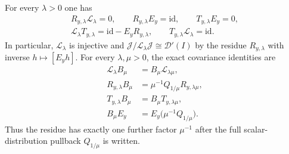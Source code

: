 \begin{theorem}
\label{thm:SDB-frobenius}
For every $\lambda>0$ one has
\begin{equation}\tag{SDB49}\label{eq:SDB-lambdaidentities}
 \begin{gathered}
 R_{y,\lambda}\mathcal L_\lambda=0,\qquad
 R_{y,\lambda}E_y=\mathrm{id},\qquad
 T_{y,\lambda}E_y=0,\\
 \mathcal L_\lambda T_{y,\lambda}
       =\mathrm{id}-E_yR_{y,\lambda},\qquad
 T_{y,\lambda}\mathcal L_\lambda=\mathrm{id}.
 \end{gathered}
\end{equation}
In particular, $\mathcal L_\lambda$ is injective and
$\mathcal J/\mathcal L_\lambda\mathcal J\cong\mathcal D'(I)$
by the residue $R_{y,\lambda}$ with inverse $h\mapsto[E_yh]$.
For every $\lambda,\mu>0$, the exact covariance identities are
\begin{equation}\tag{SDB50}\label{eq:SDB-Frobeniuscovariance}
 \begin{aligned}
 \mathcal L_\lambda B_\mu&=B_\mu\mathcal L_{\lambda\mu},\\
 R_{y,\lambda}B_\mu
       &=\mu^{-1}Q_{1/\mu}R_{y,\lambda\mu},\\
 T_{y,\lambda}B_\mu&=B_\mu T_{y,\lambda\mu},\\
 B_\mu E_y&=E_y\bigl(\mu^{-1}Q_{1/\mu}\bigr).
 \end{aligned}
\end{equation}
Thus the residue has exactly one further factor $\mu^{-1}$
after the full scalar-distribution pullback $Q_{1/\mu}$ is written.
\end{theorem}
